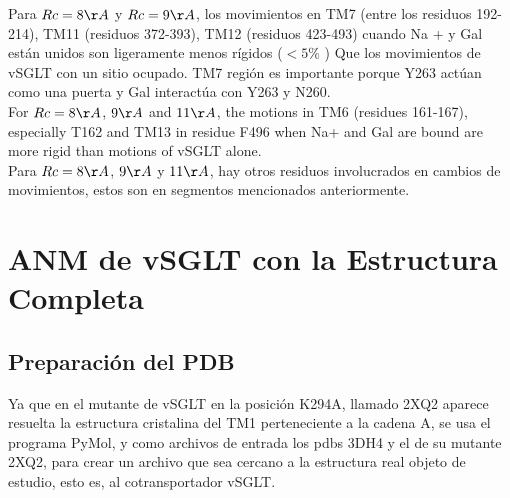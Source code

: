 Para $Rc = 8\AA$ y $Rc = 9\AA$, los movimientos en TM7 (entre los residuos 192-214), TM11 (residuos 372-393), TM12 (residuos 423-493) cuando Na + y Gal est\'{a}n unidos son ligeramente menos r\'{i}gidos ($<5\%$ ) Que los movimientos de vSGLT con un sitio ocupado. TM7 regi\'{o}n es importante porque Y263 act\'{u}an como una puerta y Gal interact\'{u}a con Y263 y N260.\\
For $Rc=8\AA$,  $9\AA$ and $11\AA$, the motions in TM6 (residues 161-167), especially T162 and TM13 in residue F496  when Na+ and Gal are bound are more rigid than  motions of vSGLT alone.\\
Para $Rc = 8\AA$, $9\AA$ y $11\AA$, hay otros residuos involucrados en cambios de movimientos, estos son en segmentos mencionados anteriormente.\\

\section{ANM de vSGLT con la Estructura Completa}
\subsection{Preparaci\'{o}n del PDB}
Ya que en el mutante de vSGLT en la posici\'{o}n K294A, llamado 2XQ2 aparece resuelta la estructura cristalina del TM1 perteneciente a la cadena A, se usa el programa PyMol, y como archivos de entrada los pdbs 3DH4 y el de su mutante 2XQ2, para crear un archivo que sea cercano a la estructura real objeto de estudio, esto es, al cotransportador vSGLT. 
